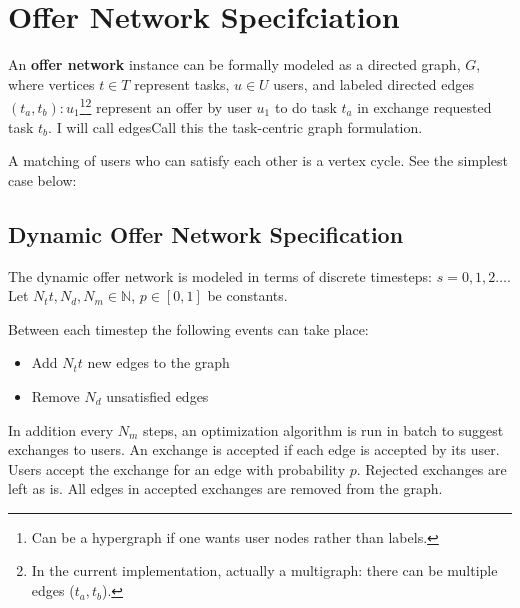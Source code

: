\documentclass[main.tex]{subfiles}
\begin{document}
\section{Offer Network Specifciation}
An \textbf{offer network} instance can be formally modeled as a directed graph, $G$, where vertices $t \in T$ represent tasks, $u \in U$ users, and labeled directed edges $(t_a,t_b) : u_1$\footnote{Can be a hypergraph if one wants user nodes rather than labels.}\footnote{In the current implementation, actually a multigraph: there can be multiple edges ($t_a,t_b$).} represent an offer by user $u_1$ to do task $t_a$ in exchange requested task $t_b$. I will call edgesCall this the task-centric graph formulation.
\begin{center}
\end{center}

A matching of users who can satisfy each other is a vertex cycle. See the simplest case below:

\begin{center}
\end{center}

\subsection{Dynamic Offer Network Specification}
The dynamic offer network is modeled in terms of discrete timesteps: $s = 0, 1, 2 \dots$.
Let $N_tt, N_d, N_m \in \mathbb{N}$, $p \in [0,1]$ be constants.

Between each timestep the following events can take place:
\begin{itemize}
  \item Add $N_tt$ new edges to the graph
  \item Remove $N_d$ unsatisfied edges
\end{itemize}

In addition every $N_m$ steps, an optimization algorithm is run in batch to suggest exchanges to users. An exchange is accepted if each edge is accepted by its user. Users accept the exchange for an edge with probability $p$. Rejected exchanges are left as is. All edges in accepted exchanges are removed from the graph.
\end{document}
